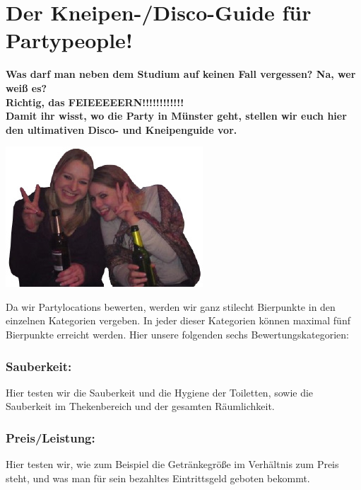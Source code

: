 \section{Der Kneipen-/Disco-Guide für Partypeople!}
\begin{multicols*}{2}
\textbf{Was darf man neben dem Studium auf keinen Fall vergessen? Na, wer weiß es?\\
Richtig, das FEIEEEEERN!!!!!!!!!!!!\\
Damit ihr wisst, wo die Party in Münster geht, stellen wir euch hier den ultimativen Disco- und Kneipenguide vor.}

\includegraphics[width=\columnwidth]{res/kneipenguide_foto_silke_annika.png}

Da wir Partylocations bewerten, werden wir ganz stilecht Bierpunkte in den einzelnen Kategorien vergeben. In jeder dieser Kategorien können maximal fünf Bierpunkte erreicht werden. Hier unsere folgenden sechs Bewertungskategorien:

\subsubsection*{Sauberkeit:}
Hier testen wir die Sauberkeit und die Hygiene der Toiletten, sowie die Sauberkeit im Thekenbereich und der gesamten Räumlichkeit.

\subsubsection*{Preis/Leistung:}
Hier testen wir, wie zum Beispiel die Getränkegröße im Verhältnis zum Preis steht, und was man für sein bezahltes Eintrittsgeld geboten bekommt.


\end{multicols*}
